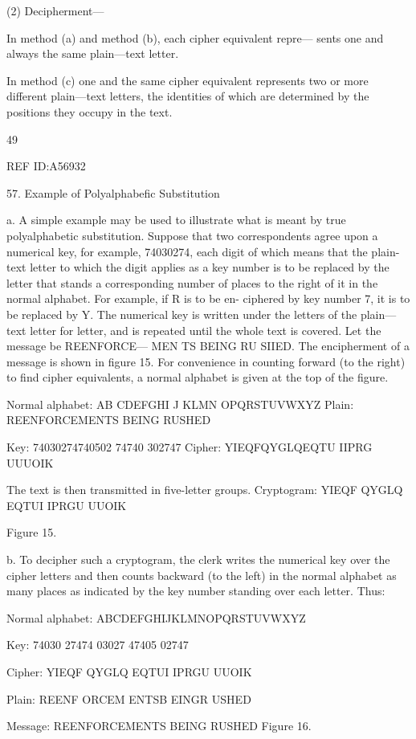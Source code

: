 {(2) Decipherment—

In method (a) and method (b), each cipher equivalent repre—
sents one and always the same plain—text letter.

In method (c) one and the same cipher equivalent represents
two or more different plain—text letters, the identities of
which are determined by the positions they occupy in the
text.

49

 

REF ID:A56932

57. Example of Polyalphabeﬁc Substitution

a. A simple example may be used to illustrate what is meant by true
polyalphabetic substitution. Suppose that two correspondents agree upon
a numerical key, for example, 74030274, each digit of which means
that the plain-text letter to which the digit applies as a key number is to
be replaced by the letter that stands a corresponding number of places to
the right of it in the normal alphabet. For example, if R is to be en-
ciphered by key number 7, it is to be replaced by Y. The numerical key is
written under the letters of the plain—text letter for letter, and is repeated
until the whole text is covered. Let the message be REENFORCE—
MEN TS BEING RU SIIED. The encipherment of a message is shown
in ﬁgure 15. For convenience in counting forward (to the right) to ﬁnd
cipher equivalents, a normal alphabet is given at the top of the ﬁgure.

Normal alphabet: AB CDEFGHI J KLMN OPQRSTUVWXYZ
Plain: REENFORCEMENTS BEING RUSHED

Key: 74030274740502 74740 302747
Cipher: YIEQFQYGLQEQTU IIPRG UUUOIK

The text is then transmitted in ﬁve-letter groups.
Cryptogram: YIEQF QYGLQ EQTUI IPRGU UUOIK

Figure 15.

b. To decipher such a cryptogram, the clerk writes the numerical key
over the cipher letters and then counts backward (to the left) in the
normal alphabet as many places as indicated by the key number standing
over each letter. Thus:

Normal alphabet: ABCDEFGHIJKLMNOPQRSTUVWXYZ

Key: 74030 27474 03027 47405 02747

Cipher: YIEQF QYGLQ EQTUI IPRGU UUOIK

Plain: REENF ORCEM ENTSB EINGR USHED

Message: REENFORCEMENTS BEING RUSHED
Figure 16.

}
